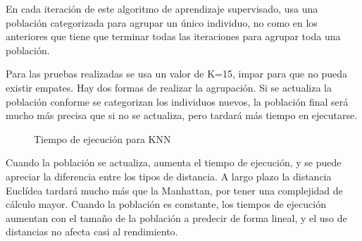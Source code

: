En cada iteración de este algoritmo de aprendizaje supervisado, usa una población categorizada para agrupar un único individuo, no como en los anteriores que tiene que terminar todas las iteraciones para agrupar toda una población.

Para las pruebas realizadas se usa un valor de K=15, impar para que no pueda existir empates. Hay dos formas de realizar la agrupación. Si se actualiza la población conforme se categorizan los individuos nuevos, la población final será mucho más precisa que si no se actualiza, pero tardará más tiempo en ejecutarse. 


\begin{figure}[h!]
	\centering
	\caption{Tiempo de ejecución para KNN}
\end{figure}

Cuando la población se actualiza, aumenta el tiempo de ejecución, y se puede apreciar la diferencia entre los tipos de distancia. A largo plazo la distancia Euclídea tardará mucho más que la Manhattan, por tener una complejidad de cálculo mayor. 
Cuando la población es constante, los tiempos de ejecución aumentan con el tamaño de la población a predecir de forma lineal, y el uso de distancias no afecta casi al rendimiento.


